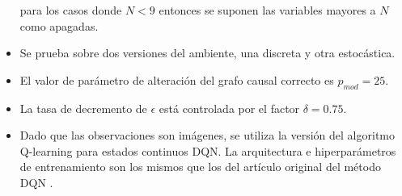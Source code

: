 \begin{itemize}
    para los casos donde $N < 9$ entonces se suponen las variables mayores
    a $N$ como apagadas. 
    \item Se prueba sobre dos versiones del ambiente, una discreta y otra estocástica.
    \item El valor de parámetro de alteración del grafo causal correcto es
    $p_{mod} = 25$.
    \item La tasa de decremento de $\epsilon$ está controlada por el factor $\delta = 0.75$.
    \item Dado que las observaciones son imágenes, se utiliza la versión 
    del algoritmo Q-learning para estados continuos DQN. La arquitectura e hiperparámetros de entrenamiento son los mismos que los del artículo original del método DQN 
    \cite{mnih2015human}. 
\end{itemize}    
\begin{figure}[h]
    \centering

\end{figure}
